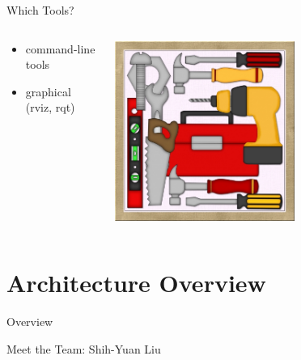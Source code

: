 \documentclass[aspectratio=43]{beamer}
\begin{document}
\begin{frame}{Which Tools?}
\begin{columns}
	\begin{column}{0.55\textwidth}
		\begin{itemize}
			\item command-line tools
                          \item graphical (rviz, rqt)              
		\end{itemize} 
        \end{column} 
        \begin{column}{0.45\textwidth} 
          \centering 
          \includegraphics[width=0.6\textwidth]{fig/tools.jpeg} 
        \end{column}
\end{columns}

\end{frame}


\section{Architecture Overview}
\begin{frame}[label=overview]{Overview}
	\tableofcontents[sectionstyle=show/shaded,subsectionstyle=show/shaded/shaded]
\end{frame}

\begin{frame}{Meet the Team: Shih-Yuan Liu}
\end{frame}
\end{document}
